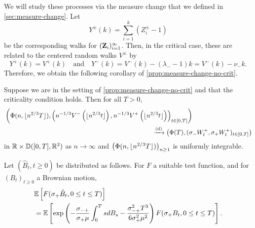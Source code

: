We will study these processes via the measure change that we defined in \cref{sec:measure-change}. Let
\begin{equation*}
  Y^{\pm}(k) = \sum_{i=1}^k (Z_i^{\pm} - 1)
\end{equation*}
be the corresponding walks for $({\mathbf Z}_i)_{i=1}^{\infty}$. Then, in the critical case, these are related to the centered random walks $V^{\pm}$ by
\begin{equation*}
  Y^+(k) = V^+(k)
  \quad \text{and} \quad
  Y^-(k) = V^-(k) - (\lambda_- - 1) k = V^-(k) - \nu_- k.
\end{equation*}
Therefore, we obtain the following corollary of \cref{prop:measure-change-no-crit}.
\begin{corollary}
  \label{cor:measure-change}
  Suppose we are in the setting of \cref{prop:measure-change-no-crit} and that the criticality condition holds. Then for all $T > 0$,
  \begin{align*}
      &\left( 
          \Phi(n, \floor{n^{2/3} T}),
          \left(
              n^{-1/3} V^-\left( \floor{n^{2/3} t} \right),
              n^{-1/3} V^+\left( \floor{n^{2/3} t} \right)
          \right)_{t \in [0, T]}
      \right) \\
      & \hspace{23em} \todist \left( 
          \Phi(T),
          (\sigma_- W^+_t, \sigma_+ W^+_t)_{t \in [0, T]}
      \right)
  \end{align*}
  in ${\mathbb R} \times {\mathbb D}([0, T], {\mathbb R}^2)$ as $n \to \infty$ and $\left(\Phi(n,\lfloor n^{2/3} T\rfloor)\right)_{n\geq 1}$ is uniformly integrable.
\end{corollary}
Let $(\hat{B}_t,t\geq 0)$ be distributed as follows. For $F$ a suitable test function, and for $(B_t)_{t\geq 0}$ a Brownian motion,
\begin{align*} &{\mathbb E}\left[F(\sigma_+ \hat{B}_t,0\leq t \leq T)\right]\\&={\mathbb E}\left[\exp\left(-\frac{\sigma_{-+}}{\sigma_+ \mu} \int_0^T s dB_s -\frac{\sigma_{-+}^2 T^3}{6\sigma_+^2 \mu^2}\right)F(\sigma_+ B_t,   0\leq t \leq T)\right].\end{align*}

